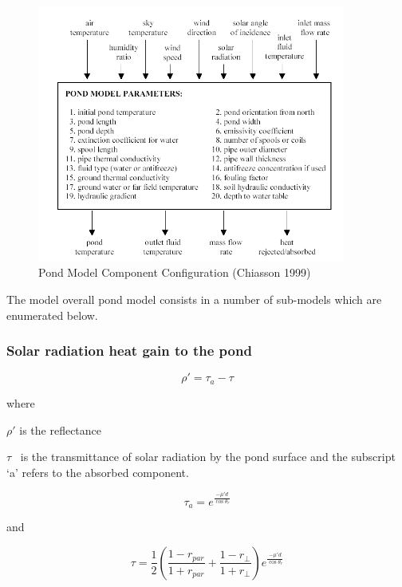 \begin{figure}[hbtp] %
\centering
\includegraphics[width=0.9\textwidth, height=0.9\textheight, keepaspectratio=true]{media/image5686.png}
\caption{  Pond Model Component Configuration (Chiasson 1999) \protect \label{fig:pond-model-component-configuration-chiasson}}
\end{figure}

The model overall pond model consists in a number of sub-models which are enumerated below.

\subsubsection{Solar radiation heat gain to the pond}\label{solar-radiation-heat-gain-to-the-pond}

\begin{equation}
\rho ' = {\tau_a} - \tau
\end{equation}

where

\(\rho '\) is the reflectance

\(\tau\) ~is the transmittance of solar radiation by the pond surface and the subscript `a' refers to the absorbed component.

\begin{equation}
{\tau_a} = {e^{\frac{{ - \mu 'd}}{{\cos {\theta_r}}}}}
\end{equation}

and

\begin{equation}
\tau  = \frac{1}{2}\left( {\frac{{1 - {r_{par}}}}{{1 + {r_{par}}}} + \frac{{1 - {r_ \bot }}}{{1 + {r_ \bot }}}} \right){e^{\frac{{ - \mu 'd}}{{\cos {\theta_r}}}}}
\end{equation}

